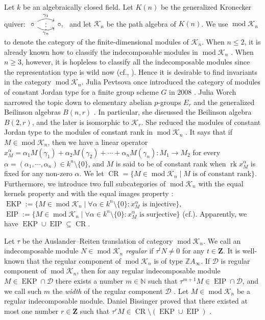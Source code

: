 \documentclass[a4paper,12pt]{amsart}
\newcommand{\cD}{\mathcal{D}}
\newcommand{\cK}{\mathcal{K}}
\DeclareMathOperator{\rk}{rk}
\DeclareMathOperator{\modd}{mod}
\DeclareMathOperator{\EIP}{EIP}
\DeclareMathOperator{\EKP}{EKP}
\DeclareMathOperator{\CR}{CR}
\begin{document}
Let $k$ be an algebraically closed field. Let $K(n)$ be the generalized Kronecker quiver:  $ 
\begin{tikzcd}
  \circ
    \arrow[r, draw=none, "{\vdots}" description]
    \arrow[r, bend left,        "\gamma_1"]
    \arrow[r, bend right, swap, "\gamma_n"]
    &
    \circ ,
\end{tikzcd}
 $  and let $\cK_n$ be the path algebra of $K(n)$. We use $\modd \cK_n$ to denote the category of the finite-dimensional modules of $\cK_n$. When $n\leq 2$, it is already known how to classify  the indecomposable modules in $\modd \cK_n$ \cite[.3]{Assem2}. When $n\geq 3$,  however, it is   hopleless to classify all the indecomposable modules since the representation type is wild now (cf.\cite[]{Assem2}, \cite[1.3]{Kerner}). Hence it is desirable to find invariants in the category $\modd \cK_n$.   Julia Pevtsova  once introduced the category of modules of constant Jordan type for a finite group scheme $G$ in 2008 \cite[Section 1]{Carlson}. Julia Worch narrowed the topic down to elementary abelian $p$-groups $E_r$ and the generalized Beilinson algebras $B(n,r)$ \cite{Julia}. In particular, she discussed the Beilinson algebra $B(2,r)$,  and the later is isomorphic to $\cK_r$. She reduced the modules of constant Jordan type to the modules of constant rank in $\modd \cK_n$ \cite[section 3]{Julia}. It says that if $M\in \modd \cK_n$, then we have a linear operator $x^{\alpha}_{M}=\alpha_1M(\gamma_1)+\alpha_2M(\gamma_2)+\cdots+\alpha_nM(\gamma_n): M_1\rightarrow M_2$ for every  $\alpha=(\alpha_1,\cdots,\alpha_n)\in k^n\setminus\{0\}$, and   $M$ is said to be of constant rank when $\rk x^{\alpha}_M$ is fixed for any non-zero  $\alpha$.   We let $\CR=\{M\in\modd\cK_n\mid M \text{ is of constant rank}\}$. Furthermore,  we  introduce two full  subcategories of $\modd\cK_n$ with the equal kernels property and with the equal images property : $\EKP:=\{M\in \modd\cK_n\mid \forall \alpha\in k^n\setminus\{0\}: x^{\alpha}_{M} \text{ is injective} \}$,  $\EIP:=\{M\in \modd\cK_n\mid \forall \alpha\in k^n\setminus\{0\}:x^{\alpha}_{M} \text{ is surjective} \}$ (cf.\cite[Definition 2.1]{Julia}). Apparently, we have $\EKP\cup \EIP \subseteq \CR$.  
 
 
  Let $\tau$ be the Auslander--Reiten translation of category $\modd\cK_n$. We call an indecomposable module $N\in \modd\cK_n$ \textit{regular} if $\tau^t N\neq 0$ for any $t\in \mathbf{Z}$. It is well-known that the regular component of $\modd\cK_n$ is  of type $\mathbb{Z}A_{\infty}$. If $\cD$ is regular component of $\modd\cK_n$, then for any  regular indecomposable module $M\in \EKP\cap \cD$ there exists a number $m\in \mathbb{N}$ such that $\tau^{m+1}M\in \EIP\cap \cD$, and we call such $m$ the \textit{width} of the regular component $\cD$ \cite[Theorem 3.3]{Julia}.  Let $M\in \modd\cK_n$ be a regular indecomposable module. Daniel Bissinger proved that there existed at most one number $r\in \mathbf{Z}$ such that $\tau^r M\in \CR\setminus (\EKP\cup \EIP)$ \cite[Proposition 3.14]{Daniel}.  
 
\end{document}
